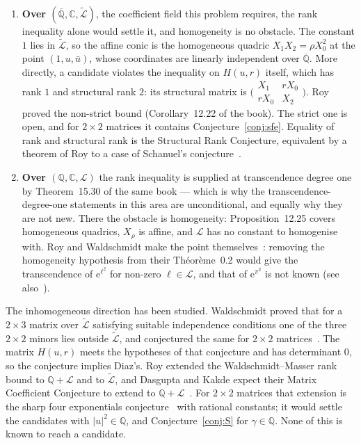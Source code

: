 \documentclass[11pt,a4paper]{article}
\theoremstyle{plain}
\theoremstyle{definition}
\newcommand{\C}{\mathbb{C}}
\newcommand{\e}{\mathrm{e}}
\newcommand{\Q}{\mathbb{Q}}
\newcommand{\Alg}{\overline{\mathbb{Q}}}
\newcommand{\Logs}{\mathcal{L}}
\newcommand{\aLogs}{\widetilde{\mathcal{L}}}
\begin{document}
\begin{enumerate}[label=\textup{(\alph*)}]
  \item \textbf{Over $(\Alg,\C,\aLogs)$}, the coefficient field this problem requires, the rank
        inequality alone would settle it, and homogeneity is no obstacle. The constant $1$ lies
        in $\aLogs$, so the affine conic is the homogeneous quadric $X_{1}X_{2}=\rho X_{0}^{2}$ at
        the point $(1,u,\bar u)$, whose coordinates are linearly independent over $\Alg$. More
        directly, a candidate violates the inequality on $H(u,r)$ itself, which has rank $1$ and
        structural rank $2$: its structural matrix is
        $\bigl(\begin{smallmatrix}X_{1}&rX_{0}\\ rX_{0}&X_{2}\end{smallmatrix}\bigr)$. Roy proved the
        non-strict bound (Corollary~12.22 of the book). The strict one is open, and for
        $2\times2$ matrices it contains Conjecture~\ref{conj:sfe}. Equality of rank and structural
        rank is the Structural Rank Conjecture, equivalent by a theorem of Roy to a case of
        Schanuel's conjecture~\cite{dasgupta-2023,dasgupta-kakde}.
  \item \textbf{Over $(\Q,\C,\Logs)$} the rank inequality is supplied at transcendence degree one
        by Theorem~15.30 of the same book --- which is why the transcendence-degree-one statements
        in this area are unconditional, and equally why they are not new. There the obstacle is
        homogeneity: Proposition~12.25 covers homogeneous quadrics, $X_{\rho}$ is affine, and
        $\Logs$ has no constant to homogenise with. Roy and Waldschmidt make the point
        themselves~\cite[p.~791]{roy-waldschmidt-1997}: removing the homogeneity hypothesis from
        their Th\'eor\`eme~0.2 would give the transcendence of $\e^{\ell^{2}}$ for non-zero
        $\ell\in\Logs$, and that of $\e^{\pi^{2}}$ is not known (see
        also~\cite[p.~593]{waldschmidt-book}).
\end{enumerate}

The inhomogeneous direction has been studied. Waldschmidt proved that for a $2\times3$ matrix over
$\aLogs$ satisfying suitable independence conditions one of the three $2\times2$ minors lies outside
$\aLogs$, and conjectured the same for $2\times2$
matrices~\cite[Theorem~1.2 and Conjecture~1.6]{waldschmidt-2005b}. The matrix $H(u,r)$ meets the
hypotheses of that conjecture and has determinant $0$, so the conjecture implies Diaz's. Roy
extended the Waldschmidt--Masser rank bound to $\Q+\Logs$ and to $\aLogs$, and Dasgupta and Kakde
expect their Matrix Coefficient Conjecture to extend to $\Q+\Logs$~\cite[\S2]{dasgupta-kakde}. For
$2\times2$ matrices that extension is the sharp four exponentials conjecture~\cite[p.~4]{waldschmidt-hopf}
with rational constants; it would settle the candidates with $\lvert u\rvert^{2}\in\Q$, and
Conjecture~\ref{conj:S} for $\gamma\in\Q$.
None of this is known to reach a candidate.
\end{document}
